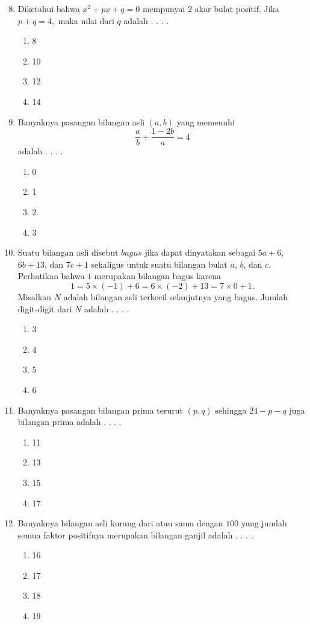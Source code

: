 \documentclass{article}
\begin{document}
\begin{enumerate}[label={Soal \arabic*}]
    \setcounter{enumi}{7}
    \item Diketahui bahwa $x^2+px+q=0$ mempunyai $2$ akar bulat positif. Jika $p+q=4,$ maka nilai dari $q$ adalah . . . .
    \begin{enumerate}[label={(\Alph*)}]
        \item 8 \item 10 \item 12 \item 14
    \end{enumerate}

    \item Banyaknya pasangan bilangan asli $(a,b)$ yang memenuhi
    $$\frac{a}{b} + \frac{1-2b}{a} =4$$
    adalah . . . .
    \begin{enumerate}[label={(\Alph*)}]
        \item 0 \item 1 \item 2 \item 3
    \end{enumerate}
    
    \item Suatu bilangan asli disebut $bagus$ jika dapat dinyatakan sebagai $5a+6$, $6b+13$, dan $7c+1$ sekaligus untuk suatu bilangan bulat $a$, $b$, dan $c$. Perhatikan bahwa $1$ merupakan bilangan bagus karena
    $$1 = 5\times (-1)+6 = 6\times (-2) +13 = 7\times 0+1.$$
    Misalkan $N$ adalah bilangan asli terkecil selanjutnya yang bagus. Jumlah digit-digit dari $N$ adalah . . . .
    \begin{enumerate}[label={(\Alph*)}]
        \item 3 \item 4 \item 5 \item 6
    \end{enumerate}

    \item Banyaknya pasangan bilangan prima terurut $(p,q)$ sehingga $24-p-q$ juga bilangan prima adalah . . . .
    \begin{enumerate}[label={(\Alph*)}]
        \item 11 \item 13 \item 15 \item 17
    \end{enumerate}

    \item Banyaknya bilangan asli kurang dari atau sama dengan $100$ yang jumlah semua faktor positifnya merupakan bilangan ganjil adalah . . . .
    \begin{enumerate}[label={(\Alph*)}]
        \item 16 \item 17 \item 18 \item 19
    \end{enumerate}
\end{enumerate}
\end{document}
